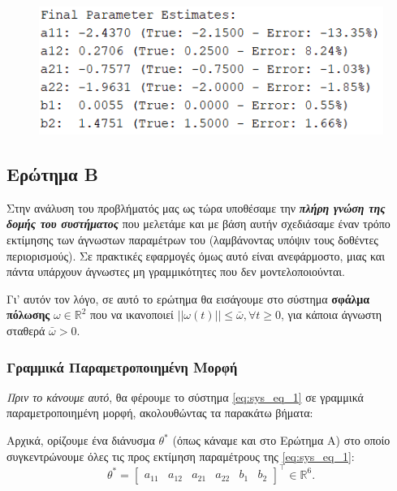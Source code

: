\documentclass[12pt]{article} %
\numberwithin{equation}{section}  %
\begin{document}
\begin{figure}[ht!]
    \centering
    \begin{minipage}{0.48\textwidth}
        \centering
        \includegraphics[width=0.8\linewidth]{plots/plot5_logs.png}
    \end{minipage}
    
    \caption{}
    \label{fig:B_est}
\end{figure}



\newpage

\subsection{Ερώτημα Β}

Στην ανάλυση του προβλήματός μας ως τώρα υποθέσαμε την \textit{\textbf{πλήρη γνώση της δομής του συστήματος}} που μελετάμε 
και με βάση αυτήν σχεδιάσαμε έναν τρόπο εκτίμησης των άγνωστων παραμέτρων του (λαμβάνοντας υπόψιν τους δοθέντες περιορισμούς). 
Σε πρακτικές εφαρμογές όμως αυτό είναι ανεφάρμοστο, μιας και πάντα υπάρχουν άγνωστες μη γραμμικότητες που δεν μοντελοποιούνται. 

Γι' αυτόν τον λόγο, σε αυτό το ερώτημα θα εισάγουμε στο σύστημα \textbf{σφάλμα πόλωσης} $\omega \in \mathbb{R}^2$ 
που να ικανοποιεί $||\omega(t)|| \le \bar{\omega}, \forall t \ge 0$, για κάποια άγνωστη σταθερά $\bar{\omega} > 0$.

\subsubsection{Γραμμικά Παραμετροποιημένη Μορφή}

\textit{Πριν το κάνουμε αυτό}, θα φέρουμε το σύστημα \eqref{eq:sys_eq_1} σε γραμμικά παραμετροποιημένη μορφή, ακολουθώντας τα παρακάτω βήματα:

\noindent\textbullet\hspace{0.2em} Αρχικά, ορίζουμε ένα διάνυσμα $\theta^*$ (όπως κάναμε και στο Ερώτημα Α) στο οποίο συγκεντρώνουμε όλες τις προς εκτίμηση παραμέτρους της \eqref{eq:sys_eq_1}:
\vspace{-\topsep}
\vspace{+2pt}
\begin{equation}
   \theta^* = \begin{bmatrix} a_{11} & a_{12} & a_{21} & a_{22} & b_{1} & b_{2} \end{bmatrix}^\top \in \mathbb{R}^6. 
\end{equation}
\end{document}
